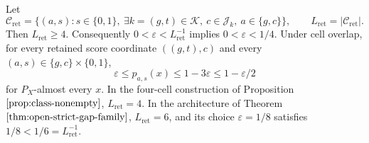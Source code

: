 Let
\[
\mathcal C_{\mathrm{ret}}
=\{(a,s):s\in\{0,1\},\ \exists k=(g,t)\in\mathcal K,\ c\in\mathcal J_k,\ a\in\{g,c\}\},
\qquad L_{\mathrm{ret}}=|\mathcal C_{\mathrm{ret}}|.
\]
Then \(L_{\mathrm{ret}}\ge4\). Consequently \(0<\varepsilon<L_{\mathrm{ret}}^{-1}\) implies \(0<\varepsilon<1/4\). Under cell overlap, for every retained score coordinate \(((g,t),c)\) and every \((a,s)\in\{g,c\}\times\{0,1\}\),
\[
\varepsilon\le p_{a,s}(x)\le1-3\varepsilon\le1-\varepsilon/2
\]
for \(P_X\)-almost every \(x\). In the four-cell construction of Proposition \(\ref{prop:class-nonempty}\), \(L_{\mathrm{ret}}=4\). In the architecture of Theorem \(\ref{thm:open-strict-gap-family}\), \(L_{\mathrm{ret}}=6\), and its choice \(\varepsilon=1/8\) satisfies \(1/8<1/6=L_{\mathrm{ret}}^{-1}\).